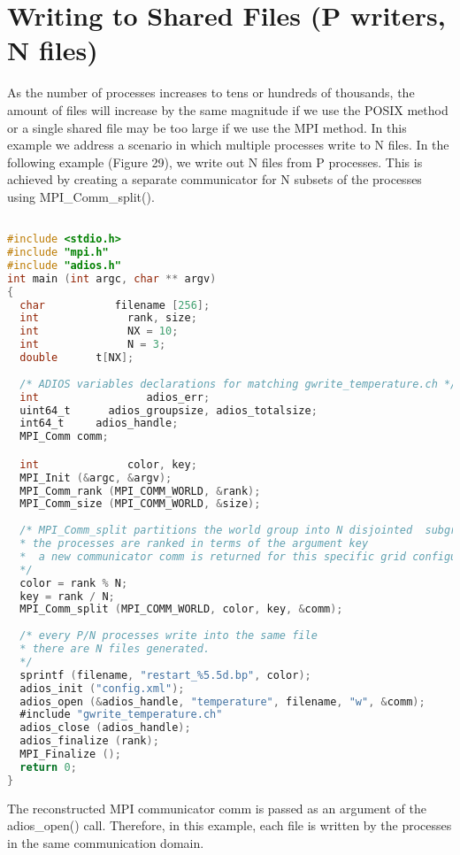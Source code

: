 \section{Writing to Shared Files (P writers, N files)}

As the number of processes increases to tens or hundreds of thousands, the amount 
of files will increase by the same magnitude if we use the POSIX method or a single 
shared file may be too large if we use the MPI method. In this example we address 
a scenario in which multiple processes write to N files. In the following example 
(Figure 29), we write out N files from P processes. This is achieved by creating 
a separate communicator for N subsets of the processes using
MPI\_Comm\_split(). 

\begin{lstlisting}[language=C,caption=Example ADIOS program writing N files
  from P processors (N)]

#include <stdio.h>
#include "mpi.h"
#include "adios.h"
int main (int argc, char ** argv) 
{
  char           filename [256];
  int              rank, size;
  int              NX = 10; 
  int              N = 3;
  double      t[NX];
  
  /* ADIOS variables declarations for matching gwrite_temperature.ch */
  int                 adios_err;
  uint64_t      adios_groupsize, adios_totalsize;
  int64_t     adios_handle;
  MPI_Comm comm;

  int              color, key;
  MPI_Init (&argc, &argv);
  MPI_Comm_rank (MPI_COMM_WORLD, &rank);
  MPI_Comm_size (MPI_COMM_WORLD, &size);
  
  /* MPI_Comm_split partitions the world group into N disjointed  subgroups, 
  * the processes are ranked in terms of the argument key  
  *  a new communicator comm is returned for this specific grid configuration
  */
  color = rank % N;
  key = rank / N;
  MPI_Comm_split (MPI_COMM_WORLD, color, key, &comm);
  
  /* every P/N processes write into the same file 
  * there are N files generated. 
  */
  sprintf (filename, "restart_%5.5d.bp", color);
  adios_init ("config.xml");
  adios_open (&adios_handle, "temperature", filename, "w", &comm);
  #include "gwrite_temperature.ch"
  adios_close (adios_handle);
  adios_finalize (rank);
  MPI_Finalize ();
  return 0;
}
\end{lstlisting}


The reconstructed MPI communicator comm is passed as an argument of the adios\_open() 
call. Therefore, in this example, each file is written by the processes in the 
same communication domain.

